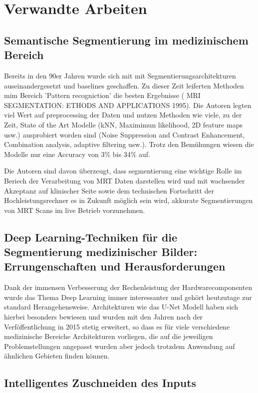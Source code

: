 \newcommand{\source}[1]{\caption*{Source: {#1}} }

\section{Verwandte Arbeiten}\raggedbottom

\subsection{Semantische Segmentierung im medizinischem Bereich}
Bereits in den 90er Jahren wurde sich mit mit Segmentierungsarchitekturen auseinandergesetzt und baselines geschaffen. Zu dieser Zeit leiferten Methoden mim Bereich 'Pattern recogniction' die besten Ergebnisse ( MRI SEGMENTATION: ETHODS AND APPLICATIONS 1995). Die Autoren legten viel Wert auf preprocessing der Daten und nutzen Methoden wie viele, zu der Zeit, State of the Art Modelle (kNN, Maximimun likelihood, 2D feature maps usw.) ausprobiert worden sind (Noise Suppression and Contrast Enhancement, Combination analysis, adaptive filtering usw.). Trotz den Bemühungen wiesen die Modelle nur eine Accuracy von 3\% bis 34\% auf. 

Die Autoren sind davon überzeugt, dass segmentierung eine wichtige Rolle im Beriech der Verarbeitung von MRT Daten darstellen wird und mit wachsender Akzeptanz auf klinischer Seite sowie dem technischen Fortschritt der Hochleistungsrechner es in Zukunft möglich sein wird, akkurate Segmentierungen von MRT Scans im live Betrieb vorzunehmen. 

\subsection{Deep Learning-Techniken für die Segmentierung medizinischer Bilder:
Errungenschaften und Herausforderungen}

Dank der immensen Verbesserung der Rechenleistung der Hardwarecomponenten wurde das Thema Deep Learning immer interessanter und gehört heutzutage zur standard Herangehensweise. Architekturen wie das U-Net Modell haben sich hierbei besonders bewiesen und wurden mit den Jahren nach der Verföffentlichung in 2015 stetig erweitert, so dass es für viele verschiedene medizinische Bereiche Architekturen vorliegen, die auf die jeweiligen Problemstellungen angepasst wurden aber jedoch trotzdem Anwendung auf ähnlichen Gebieten finden können. 

\subsection{Intelligentes Zuschneiden des Inputs}

